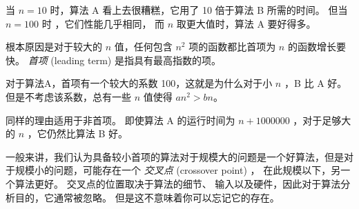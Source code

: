 
当 $n=10$ 时，算法 A 看上去很糟糕，它用了 10 倍于算法 B 所需的时间。
但当 $n=100$ 时 ，它们性能几乎相同， 而 $n$ 取更大值时，算法 A 要好得多。


根本原因是对于较大的 $n$ 值，任何包含 $n^2$ 项的函数都比首项为 $n$ 的函数增长要快。
{\em 首项} (leading term) 是指具有最高指数的项。
  


对于算法A，首项有一个较大的系数 100，这就是为什么对于小 $n$ ，B 比 A 好。
但是不考虑该系数，总有一些 $n$ 值使得 $a n^2 > b n$。


同样的理由适用于非首项。
即使算法 A 的运行时间为 $n+1000000$ ，对于足够大的 $n$ ，它仍然比算法 B 好。


一般来讲，我们认为具备较小首项的算法对于规模大的问题是一个好算法，但是对于规模小的问题，可能存在一个 {\em 交叉点} (crossover point) ， 在此规模以下，另一个算法更好。  交叉点的位置取决于算法的细节、 输入以及硬件，因此对于算法分析目的，它通常被忽略。
但是这不意味着你可以忘记它的存在。

